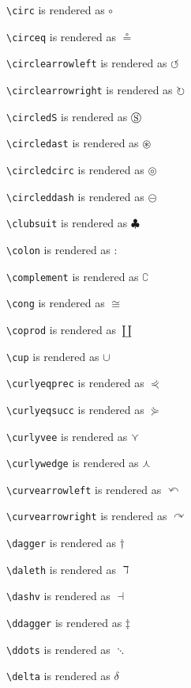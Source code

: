 \texttt{\textbackslash circ} is rendered as $\circ$

\texttt{\textbackslash circeq} is rendered as $\circeq$

\texttt{\textbackslash circlearrowleft} is rendered as $\circlearrowleft$

\texttt{\textbackslash circlearrowright} is rendered as $\circlearrowright$

\texttt{\textbackslash circledS} is rendered as $\circledS$

\texttt{\textbackslash circledast} is rendered as $\circledast$

\texttt{\textbackslash circledcirc} is rendered as $\circledcirc$

\texttt{\textbackslash circleddash} is rendered as $\circleddash$

\texttt{\textbackslash clubsuit} is rendered as $\clubsuit$

\texttt{\textbackslash colon} is rendered as $\colon$

\texttt{\textbackslash complement} is rendered as $\complement$

\texttt{\textbackslash cong} is rendered as $\cong$

\texttt{\textbackslash coprod} is rendered as $\coprod$

\texttt{\textbackslash cup} is rendered as $\cup$

\texttt{\textbackslash curlyeqprec} is rendered as $\curlyeqprec$

\texttt{\textbackslash curlyeqsucc} is rendered as $\curlyeqsucc$

\texttt{\textbackslash curlyvee} is rendered as $\curlyvee$

\texttt{\textbackslash curlywedge} is rendered as $\curlywedge$

\texttt{\textbackslash curvearrowleft} is rendered as $\curvearrowleft$

\texttt{\textbackslash curvearrowright} is rendered as $\curvearrowright$

\texttt{\textbackslash dagger} is rendered as $\dagger$

\texttt{\textbackslash daleth} is rendered as $\daleth$

\texttt{\textbackslash dashv} is rendered as $\dashv$

\texttt{\textbackslash ddagger} is rendered as $\ddagger$

\texttt{\textbackslash ddots} is rendered as $\ddots$

\texttt{\textbackslash delta} is rendered as $\delta$

